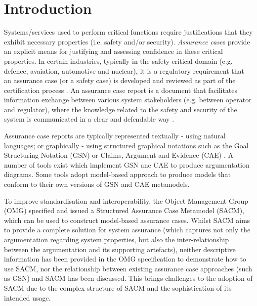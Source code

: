 \section{Introduction}
Systems/services used to perform critical functions require justifications that they exhibit necessary properties (i.e. safety and/or security). \textit{Assurance case}s provide an explicit means for justifying and assessing confidence in these critical properties. In certain industries, typically in the safety-critical domain (e.g. defence, avaiation, automotive and nuclear), it is a regulatory requirement that an assurance case (or a safety case) is developed and reviewed as part of the certification process \cite{healthFound}.
An assurance case report is a document that facilitates information exchange between various system stakeholders (e.g. between operator and regulator), where the knowledge related to the safety and security of the system is communicated in a clear and defendable way \cite{hawkins2013assurance}. 

Assurance case reports are typically represented textually - using natural languages; or graphically - using structured graphical notations such as the Goal Structuring Notation (GSN) \cite{kelly2004goal} or Claims, Argument and Evidence (CAE) \cite{cae}. A number of tools exist which implement GSN anc CAE to produce argumentation diagrams. Some tools adopt model-based approach to produce models that conform to their own versions of GSN and CAE metamodels. 


To improve standardisation and interoperability, the Object Management Group (OMG) specified and issued a Structured Assurance Case Metamodel (SACM), which can be used to construct model-based assurance cases. 
Whilst SACM aims to provide a complete solution for system assurance (which captures not only the argumentation regarding system properties, but also the inter-relationship between the argumentation and its supporting artefacts), neither descriptive information has been provided in the OMG specification to demonstrate how to use SACM, nor the relationship between existing assurance case approaches (such as GSN) and SACM has been discussed. This brings challenges to the adoption of SACM due to the complex structure of SACM and the sophistication of its intended usage. 

